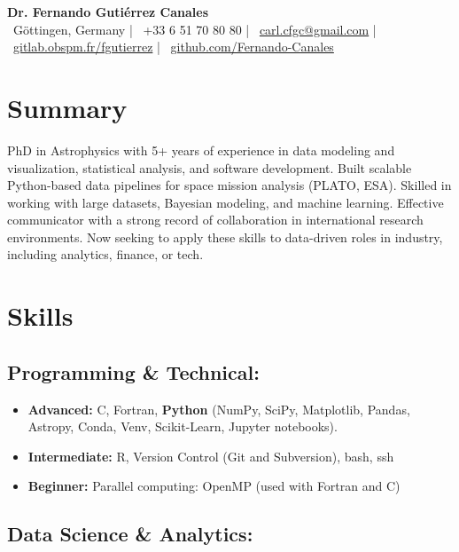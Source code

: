 \documentclass[11pt,a4paper]{article}
\begin{document}
\begin{center}
  {\Huge\bfseries Dr. Fernando Guti\'errez Canales}\\[8pt]
  \faMapMarker*~Göttingen, Germany \quad | \quad
  \faPhone~+33 6 51 70 80 80 \quad | \quad
  \faEnvelope~\href{mailto:carl.cfgc@gmail.com}{carl.cfgc@gmail.com} \quad | \quad
  \faGitlab~\href{https://gitlab.obspm.fr/fgutierrez}{gitlab.obspm.fr/fgutierrez} \quad | \quad
  \faGithub~\href{https://github.com/Fernando-Canales}{github.com/Fernando-Canales}
\end{center}
	
	\vspace{10pt}
	
	\begin{multicols}{2}
		
		\section{Summary}
		PhD in Astrophysics with 5+ years of experience in data modeling and visualization, statistical analysis, and software development. Built scalable Python-based data pipelines for space mission analysis (PLATO, ESA). Skilled in working with large datasets, Bayesian modeling, and machine learning. Effective communicator with a strong record of collaboration in international research environments. Now seeking to apply these skills to data-driven roles in industry, including analytics, finance, or tech.
		\section{Skills}
		
		\subsection{Programming \& Technical:}
		\begin{itemize}
			\item \textbf{Advanced:} C, Fortran, \textbf{Python} (NumPy, SciPy, Matplotlib, Pandas, Astropy, Conda, Venv, Scikit-Learn, Jupyter notebooks). 
			\item \textbf{Intermediate:} R, Version Control (Git and Subversion), bash, ssh
			\item \textbf{Beginner:} Parallel computing: OpenMP (used with Fortran and C)
		\end{itemize}
		
		\subsection{Data Science \& Analytics:}
		

\end{multicols}
\end{document}

